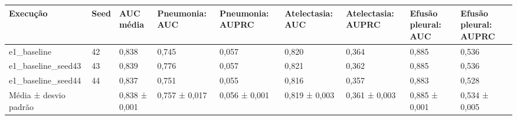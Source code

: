 \begin{tabular}{lllllllll}
\toprule
Execução & Seed & AUC média & Pneumonia: AUC & Pneumonia: AUPRC & Atelectasia: AUC & Atelectasia: AUPRC & Efusão pleural: AUC & Efusão pleural: AUPRC \\
\midrule
e1\_baseline & 42 & 0,838 & 0,745 & 0,057 & 0,820 & 0,364 & 0,885 & 0,536 \\
e1\_baseline\_seed43 & 43 & 0,839 & 0,776 & 0,057 & 0,821 & 0,362 & 0,885 & 0,536 \\
e1\_baseline\_seed44 & 44 & 0,837 & 0,751 & 0,055 & 0,816 & 0,357 & 0,883 & 0,528 \\
Média ± desvio padrão &  & 0,838 ± 0,001 & 0,757 ± 0,017 & 0,056 ± 0,001 & 0,819 ± 0,003 & 0,361 ± 0,003 & 0,885 ± 0,001 & 0,534 ± 0,005 \\
\bottomrule
\end{tabular}
